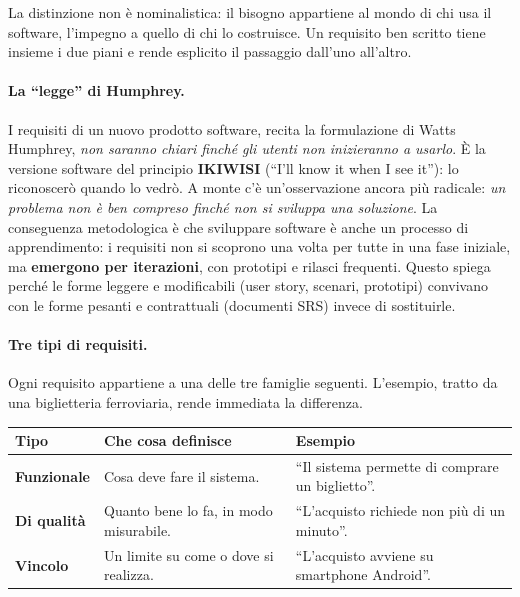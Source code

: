 \documentclass[12pt]{extarticle}
\begin{document}
\noindent La distinzione non è nominalistica: il bisogno appartiene al mondo di chi usa il software, l'impegno a quello di chi lo costruisce. Un requisito ben scritto tiene insieme i due piani e rende esplicito il passaggio dall'uno all'altro.

\paragraph{La ``legge'' di Humphrey.}
I requisiti di un nuovo prodotto software, recita la formulazione di Watts Humphrey, \textit{non saranno chiari finché gli utenti non inizieranno a usarlo}. È la versione software del principio \textbf{IKIWISI} (``I'll know it when I see it''): lo riconoscerò quando lo vedrò. A monte c'è un'osservazione ancora più radicale: \textit{un problema non è ben compreso finché non si sviluppa una soluzione}. La conseguenza metodologica è che sviluppare software è anche un processo di apprendimento: i requisiti non si scoprono una volta per tutte in una fase iniziale, ma \textbf{emergono per iterazioni}, con prototipi e rilasci frequenti. Questo spiega perché le forme leggere e modificabili (user story, scenari, prototipi) convivano con le forme pesanti e contrattuali (documenti SRS) invece di sostituirle.

\paragraph{Tre tipi di requisiti.}
Ogni requisito appartiene a una delle tre famiglie seguenti. L'esempio, tratto da una biglietteria ferroviaria, rende immediata la differenza.

\begin{center}
\small
\begin{tabular}{p{2.6cm}p{5.0cm}p{7.6cm}}
    \toprule
    \textbf{Tipo} & \textbf{Che cosa definisce} & \textbf{Esempio} \\
    \midrule
    \textbf{Funzionale} & Cosa deve fare il sistema. & ``Il sistema permette di comprare un biglietto''. \\
    \addlinespace
    \textbf{Di qualità} & Quanto bene lo fa, in modo misurabile. & ``L'acquisto richiede non più di un minuto''. \\
    \addlinespace
    \textbf{Vincolo} & Un limite su come o dove si realizza. & ``L'acquisto avviene su smartphone Android''. \\
    \bottomrule
\end{tabular}
\end{center}
\end{document}

